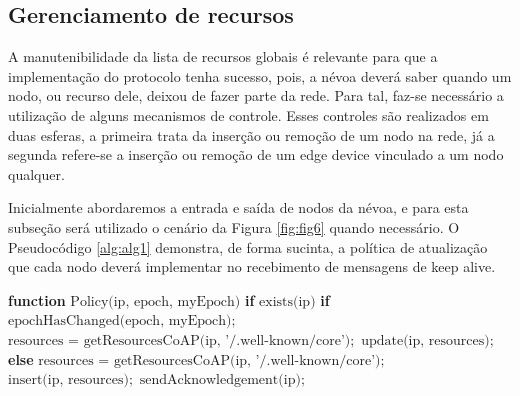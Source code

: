 \subsection{Gerenciamento de recursos}

A manutenibilidade da lista de recursos globais é relevante para que a implementação do protocolo tenha sucesso, pois, a névoa deverá saber quando um nodo, ou recurso dele, deixou de fazer parte da rede.
Para tal, faz-se necessário a utilização de alguns mecanismos de controle.
Esses controles são realizados em duas esferas, a primeira trata da inserção ou remoção de um nodo na rede,
já a segunda refere-se a inserção ou remoção de um edge device vinculado a um nodo qualquer.


Inicialmente abordaremos a entrada e saída de nodos da névoa, e para esta subseção será utilizado o cenário da Figura \ref{fig:fig6} quando necessário.
O Pseudocódigo \ref{alg:alg1} demonstra, de forma sucinta, a política de atualização que cada nodo deverá implementar no recebimento de mensagens de keep alive.


\begin{algorithm}[H]
    \begin{center}
        \begin{algorithmic}[1]
            \STATE \textbf{function} $\text{Policy(ip, epoch, myEpoch)}$
            \STATE \hspace{\algorithmicindent} \textbf{if} $\text{exists(ip)}$
            \STATE \hspace{\algorithmicindent} \hspace{\algorithmicindent} \textbf{if} $\text{epochHasChanged(epoch, myEpoch)};$
            \STATE \hspace{\algorithmicindent} \hspace{\algorithmicindent} \hspace{\algorithmicindent} $\text{resources = getResourcesCoAP(ip, '/.well-known/core')};$
            \STATE \hspace{\algorithmicindent} \hspace{\algorithmicindent} \hspace{\algorithmicindent} $\text{update(ip, resources)};$
            \STATE \hspace{\algorithmicindent} \textbf{else}
            \STATE \hspace{\algorithmicindent} \hspace{\algorithmicindent} $\text{resources = getResourcesCoAP(ip, '/.well-known/core')};$
            \STATE \hspace{\algorithmicindent} \hspace{\algorithmicindent} $\text{insert(ip, resources)};$
            \STATE \hspace{\algorithmicindent} $\text{sendAcknowledgement(ip)};$

        \end{algorithmic}
    \end{center}
    \caption[Política de atualização de recursos]%
        {\label{alg:alg1} Política de atualização de recursos.}%
    \end{algorithm}


